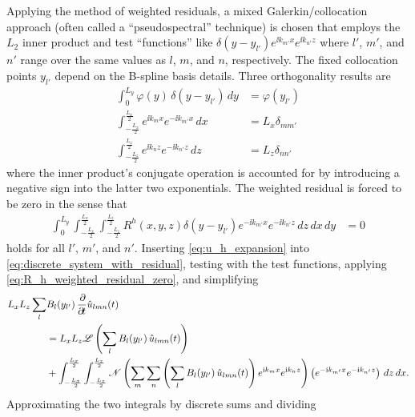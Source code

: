 Applying the method of weighted residuals, a mixed Galerkin/collocation
approach (often called a ``pseudospectral'' technique) is chosen that employs
the $L_{2}$ inner product and test ``functions'' like $\delta(y-y_{l'}) e^{\ii
k_{m'} x}e^{\ii k_{n'} z}$ where $l'$, $m'$, and $n'$ range over the same
values as $l$, $m$, and $n$, respectively.  The fixed collocation points
$y_{l'}$ depend on the B-spline basis details.  Three orthogonality
results are
\begin{subequations}
\begin{align}
   \int_0^{L_y} \varphi(y) \, \delta(y-y_{l'}) \,d\!y
&= \varphi(y_{l'})
\\
   \int_{-\frac{L_x}{2}}^{\frac{L_x}{2}} e^{\ii k_m x} e^{-\ii k_{m'} x} \,d\!x
&= L_x \delta_{m m'}
\\
   \int_{-\frac{L_z}{2}}^{\frac{L_z}{2}} e^{\ii k_n z} e^{-\ii k_{n'} z} \,d\!z
&= L_z \delta_{n n'}
\end{align}
\end{subequations}
where the inner product's conjugate operation is accounted for by introducing a
negative sign into the latter two exponentials.  The weighted residual is
forced to be zero in the sense that
\begin{align}
  \int_0^{L_y}
  \int_{-\frac{L_x}{2}}^{\frac{L_x}{2}}
  \int_{-\frac{L_z}{2}}^{\frac{L_z}{2}}
  R^h\!\left(x,y,z\right) \delta(y-y_{l'}) e^{-\ii k_{m'} x}e^{-\ii k_{n'} z}
  \,d\!z \,d\!x \,d\!y
  &=
  0
  \label{eq:R_h_weighted_residual_zero}
\end{align}
holds for all $l'$, $m'$, and $n'$.  Inserting \eqref{eq:u_h_expansion} into
\eqref{eq:discrete_system_with_residual}, testing with the test functions,
applying \eqref{eq:R_h_weighted_residual_zero}, and simplifying
\begin{align}
  L_x L_z
  \sum_{l} &B_l\!\left(y_{l'}\right)
  \frac{\partial\!}{\partial\!t} \hat{u}_{l m n}(t)
\notag\\
  &=
  L_x L_z
  \mathscr{L}\left(
    \sum_{l}
     B_l\!\left(y_{l'}\right)
    \hat{u}_{l m n}(t)
  \right)
\notag\\
  &{}+
  \int_{-\frac{L_x}{2}}^{\frac{L_x}{2}}
  \int_{-\frac{L_z}{2}}^{\frac{L_z}{2}}
  \mathscr{N}\left(
    \sum_{m}\sum_{n}
    \left(
      \sum_{l} B_l\!\left(y_{l'}\right)
      \hat{u}_{l m n}(t)
    \right)
    e^{\mathrm{i} k_m x}e^{\mathrm{i} k_n z}
  \right)
  \left(
    e^{-\mathrm{i} k_{m'} x}e^{-\mathrm{i} k_{n'} z}
  \right)
  \, dz \, dx.
\end{align}
Approximating the two integrals by discrete sums and dividing
